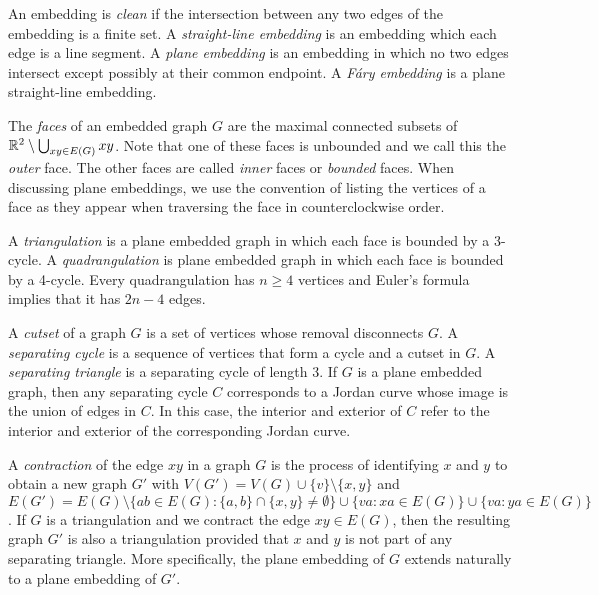 \documentclass{patmorin}
\begin{document}
An embedding is \emph{clean} if the intersection between any two edges
of the embedding is a finite set.  A \emph{straight-line embedding} is
an embedding which each edge is a line segment.  A \emph{plane embedding}
is an embedding in which no two edges intersect except possibly at their
common endpoint.  A \emph{Fáry embedding} is a plane straight-line
embedding.

The \emph{faces} of an embedded graph $G$ are the maximal connected
subsets of $\mathbb{R}^2\setminus\bigcup_{xy\in E(G)} xy$.  Note that one of
these faces is unbounded and we call this the \emph{outer} face. The
other faces are called \emph{inner} faces or \emph{bounded} faces.
When discussing plane embeddings, we use the convention of listing
the vertices of a face as they appear when traversing the face in
counterclockwise order.

A \emph{triangulation} is a plane embedded graph in which each face is
bounded by a 3-cycle.  A \emph{quadrangulation} is plane embedded graph
in which each face is bounded by a 4-cycle. Every quadrangulation has
$n\ge 4$ vertices and Euler's formula implies that it has $2n-4$ edges.

A \emph{cutset} of a graph $G$ is a set of vertices whose removal
disconnects $G$.  A \emph{separating cycle} is a sequence of vertices
that form a cycle and a cutset in $G$.  A \emph{separating triangle}
is a separating cycle of length 3.  If $G$ is a plane embedded graph,
then any separating cycle $C$ corresponds to a Jordan curve whose image
is the union of edges in $C$.  In this case, the interior and exterior of
$C$ refer to the interior and exterior of the corresponding Jordan curve.

A \emph{contraction} of the edge $xy$ in a graph $G$ is the
process of identifying $x$ and $y$ to obtain a new graph $G'$ with
$V(G')=V(G)\cup\{v\}\setminus\{x,y\}$ and $E(G')=E(G)\setminus\{ab\in
E(G): \{a,b\}\cap\{x,y\}\neq\emptyset\}\cup\{va: xa\in E(G)\}\cup
\{va:ya\in E(G)\}$.  If $G$ is a triangulation and we contract the edge
$xy\in E(G)$, then the resulting graph $G'$ is also a triangulation
provided that $x$ and $y$ is not part of any separating triangle. More
specifically, the plane embedding of $G$ extends naturally to a plane
embedding of $G'$.
\end{document}
